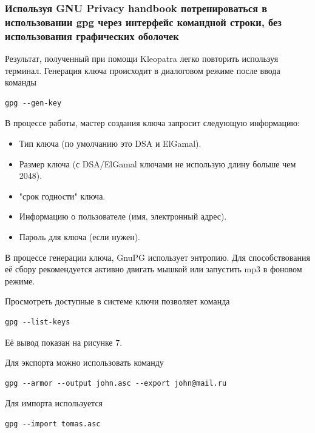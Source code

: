 \documentclass[12pt,a4paper]{article}
\begin{document}
\subsubsection{Используя GNU Privacy handbook потренироваться в использовании gpg через интерфейс командной строки, без использования графических оболочек}
Результат, полученный при помощи Kleopatra легко повторить используя терминал. Генерация ключа происходит в диалоговом режиме после ввода команды
\begin{verbatim}gpg --gen-key
\end{verbatim}
В процессе работы, мастер создания ключа запросит следующую информацию:
\begin{itemize}
	\item{Тип ключа (по умолчанию это DSA и ElGamal).}
	\item{Размер ключа (с DSA/ElGamal ключами не использую длину больше чем 2048).}
	\item{"срок годности" ключа.}
	\item{Информацию о пользователе (имя, электронный адрес).}
	\item{Пароль для ключа (если нужен).}
\end{itemize}

В процессе генерации ключа, GnuPG использует энтропию. Для способствования её сбору рекомендуется активно двигать мышкой или запустить mp3 в фоновом режиме.

Просмотреть доступные в системе ключи позволяет команда
\begin{verbatim}gpg --list-keys
\end{verbatim}
Её вывод показан на рисунке 7.

Для экспорта можно использовать команду
\begin{verbatim}gpg --armor --output john.asc --export john@mail.ru
\end{verbatim}

Для импорта используется
\begin{verbatim}gpg --import tomas.asc
\end{verbatim}
\end{document}
